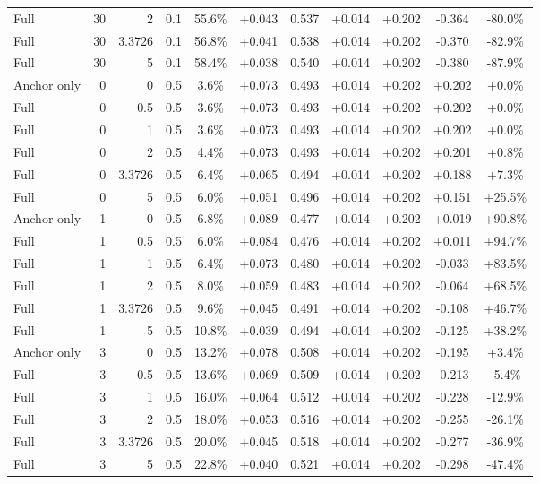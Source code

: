 \begin{table}[htbp]
\begin{tabular}{lrrrccccccc}
Full & 30 & 2 & 0.1 & 55.6\% & +0.043 & 0.537 & +0.014 & +0.202 & -0.364 & -80.0\% \\
Full & 30 & 3.3726 & 0.1 & 56.8\% & +0.041 & 0.538 & +0.014 & +0.202 & -0.370 & -82.9\% \\
Full & 30 & 5 & 0.1 & 58.4\% & +0.038 & 0.540 & +0.014 & +0.202 & -0.380 & -87.9\% \\
Anchor only & 0 & 0 & 0.5 & 3.6\% & +0.073 & 0.493 & +0.014 & +0.202 & +0.202 & +0.0\% \\
Full & 0 & 0.5 & 0.5 & 3.6\% & +0.073 & 0.493 & +0.014 & +0.202 & +0.202 & +0.0\% \\
Full & 0 & 1 & 0.5 & 3.6\% & +0.073 & 0.493 & +0.014 & +0.202 & +0.202 & +0.0\% \\
Full & 0 & 2 & 0.5 & 4.4\% & +0.073 & 0.493 & +0.014 & +0.202 & +0.201 & +0.8\% \\
Full & 0 & 3.3726 & 0.5 & 6.4\% & +0.065 & 0.494 & +0.014 & +0.202 & +0.188 & +7.3\% \\
Full & 0 & 5 & 0.5 & 6.0\% & +0.051 & 0.496 & +0.014 & +0.202 & +0.151 & +25.5\% \\
Anchor only & 1 & 0 & 0.5 & 6.8\% & +0.089 & 0.477 & +0.014 & +0.202 & +0.019 & +90.8\% \\
Full & 1 & 0.5 & 0.5 & 6.0\% & +0.084 & 0.476 & +0.014 & +0.202 & +0.011 & +94.7\% \\
Full & 1 & 1 & 0.5 & 6.4\% & +0.073 & 0.480 & +0.014 & +0.202 & -0.033 & +83.5\% \\
Full & 1 & 2 & 0.5 & 8.0\% & +0.059 & 0.483 & +0.014 & +0.202 & -0.064 & +68.5\% \\
Full & 1 & 3.3726 & 0.5 & 9.6\% & +0.045 & 0.491 & +0.014 & +0.202 & -0.108 & +46.7\% \\
Full & 1 & 5 & 0.5 & 10.8\% & +0.039 & 0.494 & +0.014 & +0.202 & -0.125 & +38.2\% \\
Anchor only & 3 & 0 & 0.5 & 13.2\% & +0.078 & 0.508 & +0.014 & +0.202 & -0.195 & +3.4\% \\
Full & 3 & 0.5 & 0.5 & 13.6\% & +0.069 & 0.509 & +0.014 & +0.202 & -0.213 & -5.4\% \\
Full & 3 & 1 & 0.5 & 16.0\% & +0.064 & 0.512 & +0.014 & +0.202 & -0.228 & -12.9\% \\
Full & 3 & 2 & 0.5 & 18.0\% & +0.053 & 0.516 & +0.014 & +0.202 & -0.255 & -26.1\% \\
Full & 3 & 3.3726 & 0.5 & 20.0\% & +0.045 & 0.518 & +0.014 & +0.202 & -0.277 & -36.9\% \\
Full & 3 & 5 & 0.5 & 22.8\% & +0.040 & 0.521 & +0.014 & +0.202 & -0.298 & -47.4\% \\

\end{tabular}
\end{table}
